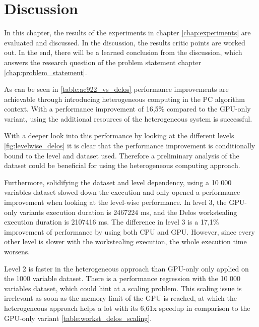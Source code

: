 \chapter{Discussion}
\label{chap:discussion}
In this chapter, the results of the experiments in chapter \ref{chap:experiments} are evaluated and discussed. In the discussion, the results critic points are worked out. In the end, there will be a learned conclusion from the discussion, which answers the research question of the problem statement chapter \ref{chap:problem_statement}.

% 
As can be seen in \ref{table:ac922_vs_delos} performance improvements are achievable through introducing heterogeneous computing in the PC algorithm context. With a performance improvement of 16,5\% compared to the GPU-only variant, using the additional resources of the heterogeneous system is successful.

With a deeper look into this performance by looking at the different levels \ref{fig:levelwise_delos} it is clear that the performance improvement is conditionally bound to the level and dataset used. Therefore a preliminary analysis of the dataset could be beneficial for using the heterogeneous computing approach.

Furthermore, solidifying the dataset and level dependency, using a 10 000 variables dataset slowed down the execution and only opened a performance improvement when looking at the level-wise performance. In level 3, the GPU-only variants execution duration is 2467224 ms, and the Delos workstealing execution duration is 2107416 ms.
The difference in level 3 is a 17,1\% improvement of performance by using both CPU and GPU. However, since every other level is slower with the workstealing execution, the whole execution time worsens.

Level 2 is faster in the heterogeneous approach than GPU-only only applied on the 1000 variable dataset. There is a performance regression with the 10 000 variables dataset, which could hint at a scaling problem.
This scaling issue is irrelevant as soon as the memory limit of the GPU is reached, at which the heterogeneous approach helps a lot with its 6,61x speedup in comparison to the GPU-only variant \ref{table:workst_delos_scaling}.


